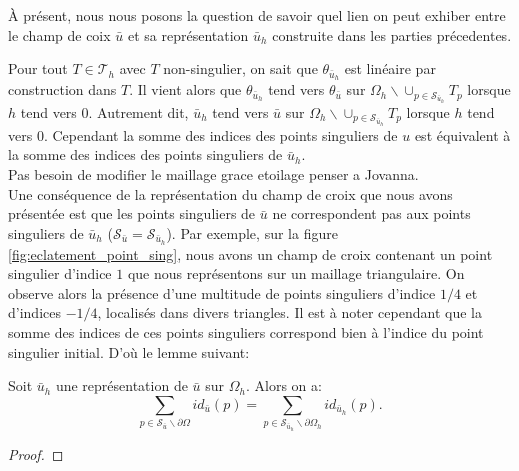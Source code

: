 À présent, nous nous posons la question de savoir quel lien on peut exhiber entre le champ de coix $\bar{u}$ et sa représentation $\bar{u}_h$ construite dans les parties précedentes.

Pour tout $T\in\mathcal{T}_h$ avec $T$ non-singulier, on sait que $\theta_{\bar{u}_h}$ est linéaire par construction dans $T$. Il vient alors que $\theta_{\bar{u}_h}$ tend vers $\theta_{\bar{u}}$ sur $\Omega_h\backslash\cup_{p\in\mathcal{S}_{\bar{u}_h}}T_p$ lorsque $h$ tend vers $0$. Autrement dit, $\bar{u}_h$ tend vers $\bar{u}$ sur $\Omega_h\backslash\cup_{p\in\mathcal{S}_{\bar{u}_h}}T_p$ lorsque $h$ tend vers $0$. \color{red} Cependant la somme des indices des points singuliers de $u$ est équivalent à la somme des indices des points singuliers de $\bar{u}_h$.\\
Pas besoin de modifier le maillage grace etoilage penser a Jovanna\color{black}.
\[\]
Une conséquence de la représentation du champ de croix que nous avons présentée est que les points singuliers de $\bar{u}$ ne correspondent pas aux points singuliers de $\bar{u}_h$ ($\mathcal{S}_{\bar{u}}=\mathcal{S}_{\bar{u}_h}$). Par exemple, sur la figure \ref{fig:eclatement_point_sing}, nous avons un champ de croix contenant un point singulier d'indice $1$ que nous représentons sur un maillage triangulaire. On observe alors la présence d'une multitude de points singuliers d'indice $1/4$ et d'indices $-1/4$, localisés dans divers triangles. Il est à noter cependant que la somme des indices de ces points singuliers correspond bien à l'indice du point singulier initial. D'où le lemme suivant:

\begin{lemma}
 Soit $\bar{u}_h$ une représentation de $\bar{u}$ sur $\Omega_h$. Alors on a:
 $$
 \sum_{p\in\mathcal{S}_{\bar{u}}\backslash\partial\Omega}id_{\bar{u}}(p)=\sum_{p\in\mathcal{S}_{\bar{u}_h}\backslash\partial\Omega_h}id_{\bar{u}_h}(p).
 $$
\end{lemma}

\begin{proof}

\end{proof}


